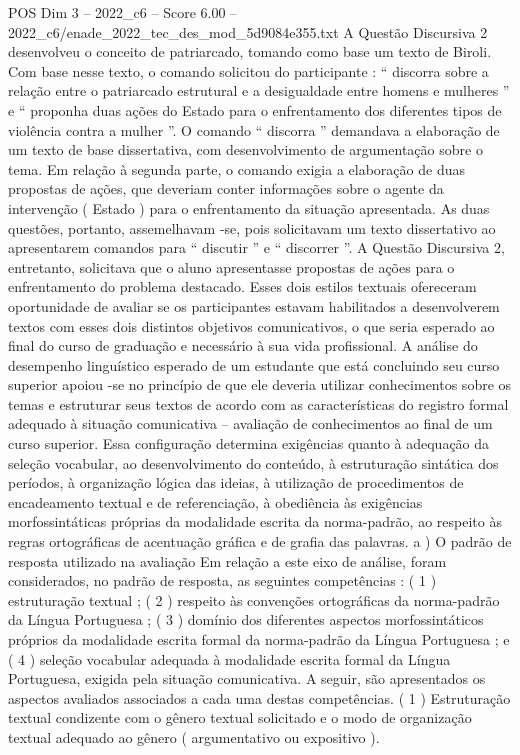 \begin{textsample}{POS Dim 3 – 2022\_c6 – Score 6.00 – 2022\_c6/enade\_2022\_tec\_des\_mod\_5d9084e355.txt}
A Questão Discursiva 2 desenvolveu o conceito de patriarcado, tomando como base um texto de Biroli.
Com base nesse texto, o comando solicitou do participante : “ discorra sobre a relação entre o patriarcado estrutural e a desigualdade entre homens e mulheres ” e “ proponha duas ações do Estado para o enfrentamento dos diferentes tipos de violência contra a mulher ”.
O comando “ discorra ” demandava a elaboração de um texto de base dissertativa, com desenvolvimento de argumentação sobre o tema.
Em relação à segunda parte, o comando exigia a elaboração de duas propostas de ações, que deveriam conter informações sobre o agente da intervenção ( Estado ) para o enfrentamento da situação apresentada.
As duas questões, portanto, assemelhavam -se, pois solicitavam um texto dissertativo ao apresentarem comandos para “ discutir ” e “ discorrer ”.
A Questão Discursiva 2, entretanto, solicitava que o aluno apresentasse propostas de ações para o enfrentamento do problema destacado.
Esses dois estilos textuais ofereceram oportunidade de avaliar se os participantes estavam habilitados a desenvolverem textos com esses dois distintos objetivos comunicativos, o que seria esperado ao final do curso de graduação e necessário à sua vida profissional.
A análise do desempenho linguístico esperado de um estudante que está concluindo seu curso superior apoiou -se no princípio de que ele deveria utilizar conhecimentos sobre os temas e estruturar seus textos de acordo com as características do registro formal adequado à situação comunicativa – avaliação de conhecimentos ao final de um curso superior.
Essa configuração determina exigências quanto à adequação da seleção vocabular, ao desenvolvimento do conteúdo, à estruturação sintática dos períodos, à organização lógica das ideias, à utilização de procedimentos de encadeamento textual e de referenciação, à obediência às exigências morfossintáticas próprias da modalidade escrita da norma-padrão, ao respeito às regras ortográficas de acentuação gráfica e de grafia das palavras. a ) O padrão de resposta utilizado na avaliação Em relação a este eixo de análise, foram considerados, no padrão de resposta, as seguintes competências : ( 1 ) estruturação textual ; ( 2 ) respeito às convenções ortográficas da norma-padrão da Língua Portuguesa ; ( 3 ) domínio dos diferentes aspectos morfossintáticos próprios da modalidade escrita formal da norma-padrão da Língua Portuguesa ; e ( 4 ) seleção vocabular adequada à modalidade escrita formal da Língua Portuguesa, exigida pela situação comunicativa.
A seguir, são apresentados os aspectos avaliados associados a cada uma destas competências. ( 1 ) Estruturação textual condizente com o gênero textual solicitado e o modo de organização textual adequado ao gênero ( argumentativo ou expositivo ).

\end{textsample}
